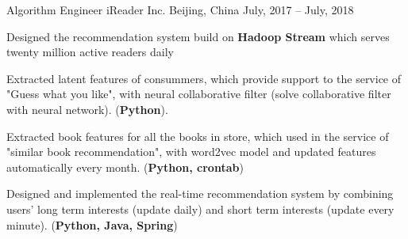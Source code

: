 

\begin{cventries}
  \cventry
    {Algorithm Engineer } %
    {iReader Inc.} %
    {Beijing, China} %
    {July, 2017 -- July, 2018} %
    {
      \begin{cvitems} %
        \item {Designed the recommendation system build on \textbf{Hadoop Stream} which serves twenty million active readers daily}
        \item {Extracted latent features of consummers, which provide support to the service of "Guess what you like", with neural collaborative filter (solve collaborative filter with neural network). (\textbf{Python}).}
        \item {Extracted book features for all the books in store, which used in the service of "similar book recommendation", with word2vec model and updated features automatically every month. (\textbf{Python, crontab})}
        \item {Designed and implemented the real-time recommendation system by combining users' long term interests (update daily) and short term interests (update every minute). (\textbf{Python, Java, Spring})}
      \end{cvitems}
    }
\end{cventries}
